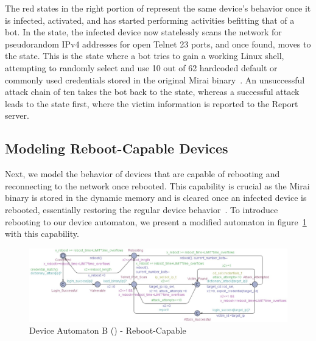 The red states in the right portion of \DA represent the same device's behavior once it is infected, activated, and has started performing activities befitting that of a bot. In the  state, the infected device now statelessly scans the network for pseudorandom IPv4 addresses for open Telnet 23 ports, and once found, moves to the  state. This is the state where a bot tries to gain a working Linux shell, attempting to randomly select and use 10 out of 62 hardcoded default or commonly used credentials stored in the original Mirai binary~\cite{kambourakis2017mirai}. An unsuccessful attack chain of ten takes the bot back to the  state, whereas a successful attack leads to the  state first, where the victim information is reported to the Report server.
\par


\subsection{Modeling Reboot-Capable Devices}
\label{sub:modeling_reboot_capable_devices}
Next, we model the behavior of devices that are capable of rebooting and reconnecting to the network once rebooted. This capability is crucial as the Mirai binary is stored in the dynamic memory and is cleared once an infected device is rebooted, essentially restoring the regular device behavior~\cite{tanaka2019_PN_Botnet}. To introduce rebooting to our device automaton, we present a modified automaton in figure~\ref{fig:device_type_b} with this capability.
\par
\begin{figure}[t!]
    \centering
    \includegraphics[width=\linewidth]{Figures/Device_t2_automaton.jpg}
    \caption{Device Automaton B (\DB) - Reboot-Capable}
    \label{fig:device_type_b}
    \vspace{-0.3 cm}
\end{figure}
\par

